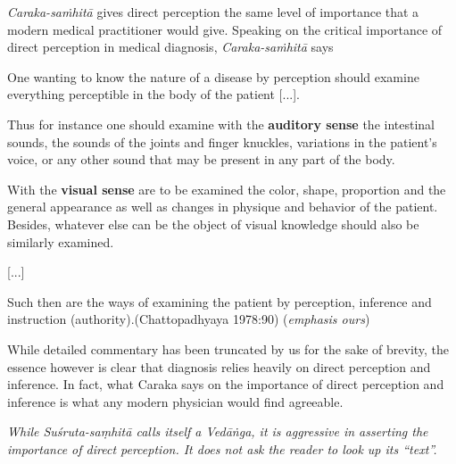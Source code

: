 {{\sl Caraka-saṁhitā}\relax} gives direct perception the same level of importance that a modern medical practitioner would give. Speaking on the critical importance of direct perception in medical diagnosis, {\sl Caraka-saṁhitā} says
\begin{myquote}
One wanting to know the nature of a disease by perception should examine everything perceptible in the body of the patient [...].

Thus for instance one should examine with the {\bf auditory sense} the intestinal sounds, the sounds of the joints and finger knuckles, variations in the patient's voice, or any other sound that may be present in any part of the body.  

With the {\bf visual sense} are to be examined the color, shape, proportion and the general appearance as well as changes in physique and behavior of the patient.  Besides, whatever else can be the object of visual knowledge should also be similarly examined.

[...]

Such then are the ways of examining the patient by perception, inference and instruction (authority).\hfill (Chattopadhyaya 1978:90) ({\sl emphasis ours})
\end{myquote}

While detailed commentary has been truncated by us for the sake of brevity, the essence however is clear that diagnosis relies heavily on direct perception and inference.  In fact, what Caraka says on the importance of direct perception and inference is what any modern physician would find agreeable.

{{\sl While Suśruta-saṃhitā calls itself a Vedāṅga, it is aggressive in asserting the importance of direct perception. It does not ask the reader to look up its ``text''.}}

